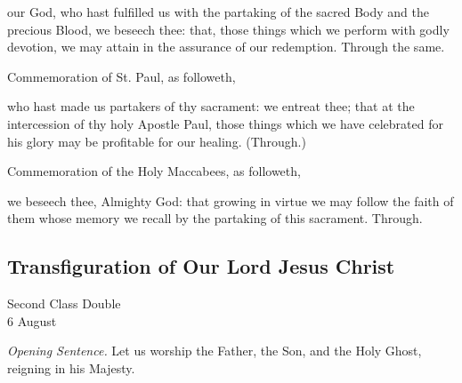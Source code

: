 \postcommunion
{} our God, who hast fulfilled us with the partaking of the sacred Body and the precious Blood, we beseech thee: that, those things which we perform with godly devotion, we may attain in the assurance of our redemption. Through the same.

\begin{rubric}
	 Commemoration of St. Paul, as followeth,
\end{rubric}
 who hast made us partakers of thy sacrament: we entreat thee; that at the intercession of thy holy Apostle Paul, those things which we have celebrated for his glory may be profitable for our healing. (Through.)

\begin{rubric}
	 Commemoration of the Holy Maccabees, as followeth,
\end{rubric}
 we beseech thee, Almighty God: that growing in virtue we may follow the faith of them whose memory we recall by the partaking of this sacrament. Through.


\subsection{Transfiguration of Our Lord Jesus Christ}
\begin{inhead}
    {Second Class Double\\
6 August}
\end{inhead}
\par\noindent
\textit{Opening Sentence.} Let us worship the Father, the Son, and the Holy Ghost, reigning in his Majesty.

